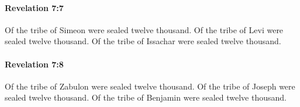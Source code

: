 		\paragraph{Revelation 7:7} %
			\label{REVELATIONNT-7-7}

			Of the tribe of Simeon were sealed twelve thousand. Of the tribe of Levi were sealed twelve thousand. Of the tribe of Issachar were sealed twelve thousand.

			\begin{framed}
			\scriptsize
				\begin{compactdesc}
					\item[SBLG] 
				\end{compactdesc}
			\end{framed}

		\paragraph{Revelation 7:8} %
			\label{REVELATIONNT-7-8}

			Of the tribe of Zabulon were sealed twelve thousand. Of the tribe of Joseph were sealed twelve thousand. Of the tribe of Benjamin were sealed twelve thousand.


